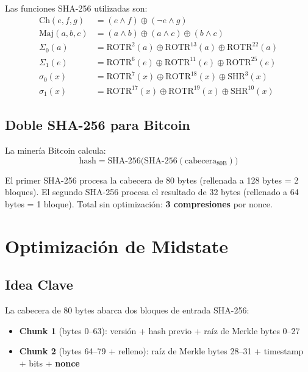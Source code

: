 \documentclass[12pt,a4paper]{article}
\begin{document}
Las funciones SHA-256 utilizadas son:
\begin{align}
    \text{Ch}(e,f,g)  &= (e \wedge f) \oplus (\neg e \wedge g) \\
    \text{Maj}(a,b,c) &= (a \wedge b) \oplus (a \wedge c) \oplus (b \wedge c) \\
    \Sigma_0(a)        &= \text{ROTR}^2(a) \oplus \text{ROTR}^{13}(a) \oplus \text{ROTR}^{22}(a) \\
    \Sigma_1(e)        &= \text{ROTR}^6(e) \oplus \text{ROTR}^{11}(e) \oplus \text{ROTR}^{25}(e) \\
    \sigma_0(x)        &= \text{ROTR}^7(x) \oplus \text{ROTR}^{18}(x) \oplus \text{SHR}^3(x) \\
    \sigma_1(x)        &= \text{ROTR}^{17}(x) \oplus \text{ROTR}^{19}(x) \oplus \text{SHR}^{10}(x)
\end{align}

\subsection{Doble SHA-256 para Bitcoin}

La miner\'ia Bitcoin calcula:
\[
    \text{hash} = \text{SHA-256}\bigl(\text{SHA-256}(\text{cabecera}_{80\text{B}})\bigr)
\]

El primer SHA-256 procesa la cabecera de 80 bytes (rellenada a 128 bytes = 2 bloques).
El segundo SHA-256 procesa el resultado de 32 bytes (rellenado a 64 bytes = 1 bloque).
Total sin optimizaci\'on: \textbf{3 compresiones} por nonce.

\section{Optimizaci\'on de Midstate}

\subsection{Idea Clave}

La cabecera de 80 bytes abarca dos bloques de entrada SHA-256:
\begin{itemize}[leftmargin=2em]
    \item \textbf{Chunk 1} (bytes 0--63): versi\'on + hash previo + ra\'iz de Merkle bytes 0--27
    \item \textbf{Chunk 2} (bytes 64--79 + relleno): ra\'iz de Merkle bytes 28--31 + timestamp + bits + \textbf{nonce}
\end{itemize}
\end{document}
